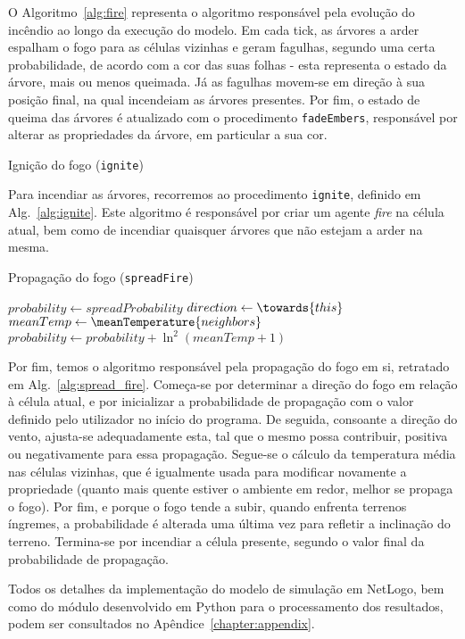 O Algoritmo~\ref{alg:fire} representa o algoritmo responsável pela evolução do incêndio ao longo da execução do modelo. Em cada tick, as árvores a arder espalham o fogo para as células vizinhas e geram fagulhas, segundo uma certa probabilidade, de acordo com a cor das suas folhas - esta representa o estado da árvore, mais ou menos queimada. Já as fagulhas movem-se em direção à sua posição final, na qual incendeiam as árvores presentes. Por fim, o estado de queima das árvores é atualizado com o procedimento \texttt{fadeEmbers}, responsável por alterar as propriedades da árvore, em particular a sua cor.

\begin{algorithm}
\caption{Ignição do fogo (\texttt{ignite})}\label{alg:ignite}
\;
\end{algorithm}

Para incendiar as árvores, recorremos ao procedimento \texttt{ignite}, definido em Alg.~\ref{alg:ignite}. Este algoritmo é responsável por criar um agente \textit{fire} na célula atual, bem como de incendiar quaisquer árvores que não estejam a arder na mesma.


\begin{algorithm}
\caption{Propagação do fogo (\texttt{spreadFire})}\label{alg:spread_fire}
$probability \gets spreadProbability$\;
$direction \gets \towards{this}$\;
$meanTemp \gets \meanTemperature{neighbors}$\;
$probability \gets probability + \ln^2{(meanTemp + 1)}$\;
\end{algorithm}

Por fim, temos o algoritmo responsável pela propagação do fogo em si, retratado em Alg.~\ref{alg:spread_fire}. Começa-se por determinar a direção do fogo em relação à célula atual, e por inicializar a probabilidade de propagação com o valor definido pelo utilizador no início do programa. De seguida, consoante a direção do vento, ajusta-se adequadamente esta, tal que o mesmo possa contribuir, positiva ou negativamente para essa propagação. Segue-se o cálculo da temperatura média nas células vizinhas, que é igualmente usada para modificar novamente a propriedade (quanto mais quente estiver o ambiente em redor, melhor se propaga o fogo). Por fim, e porque o fogo tende a subir, quando enfrenta terrenos íngremes, a probabilidade é alterada uma última vez para refletir a inclinação do terreno. Termina-se por incendiar a célula presente, segundo o valor final da probabilidade de propagação.

Todos os detalhes da implementação do modelo de simulação em NetLogo, bem como do módulo desenvolvido em Python para o processamento dos resultados, podem ser consultados no Apêndice~\ref{chapter:appendix}.